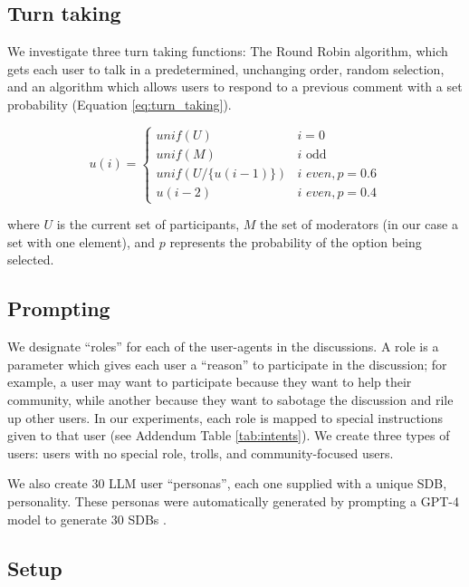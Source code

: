 \subsection{Turn taking}
\label{ssec:experimental:turn}

We investigate three turn taking functions: The Round Robin algorithm, which gets each user to talk in a predetermined, unchanging order, random selection, and an algorithm which allows users to respond to a previous comment with a set probability (Equation \ref{eq:turn_taking}).

\small
\begin{equation}
\label{eq:turn_taking}
    u(i) = \left\{
\begin{array}{ll}
\textit{unif}(U) & i=0\\
    \textit{unif}(M) & i \text{ odd}\\
    \textit{unif}(U/\{u(i-1)\}) & i \textit{ even}, p=0.6 \\
    u(i-2) & i \textit{ even}, p=0.4 
\end{array} 
\right.
\end{equation}
\normalsize

\noindent where $U$ is the current set of participants, $M$ the set of moderators (in our case a set with one element), and $p$ represents the probability of the option being selected.


\subsection{Prompting}

We designate “roles” for each of the user-agents in the discussions. A role is a parameter which gives each user a “reason” to participate in the discussion; for example, a user may want to participate because they want to help their community, while another because they want to sabotage the discussion and rile up other users. In our experiments, each role is mapped to special instructions given to that user (see Addendum Table \ref{tab:intents}). We create three types of users: users with no special role, trolls, and community-focused users.

We also create 30 \ac{LLM} user “personas”,  each one supplied with a unique \ac{SDB}, personality. These personas were automatically generated by prompting a GPT-4 model to generate $30$ \acp{SDB} \cite{openai2024gpt4technicalreport}.


\subsection{Setup}

